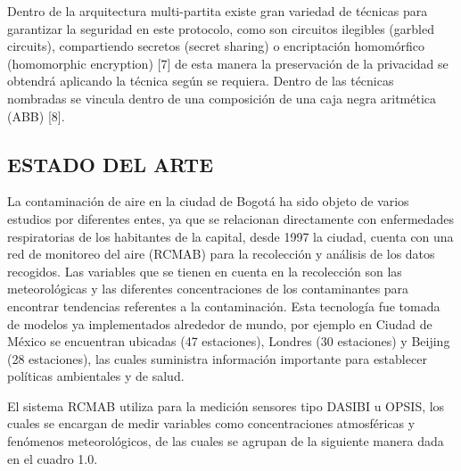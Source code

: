 \documentclass[a4paper, 11pt, oneside]{article}
\theoremstyle{definition}
\theoremstyle{remark}
\begin{document}
Dentro de la arquitectura multi-partita existe gran variedad de técnicas para garantizar la seguridad en este protocolo, como son circuitos ilegibles (garbled circuits), compartiendo secretos (secret sharing) o encriptación homomórfico (homomorphic encryption) [7] de esta manera la preservación de la privacidad se obtendrá aplicando la técnica según se requiera. Dentro de las técnicas nombradas se vincula dentro de una composición de una caja negra aritmética (ABB) [8].

\subsection{ESTADO DEL ARTE}
La contaminación de aire en la ciudad de Bogotá ha sido objeto de varios estudios por diferentes entes, ya que se relacionan directamente con enfermedades respiratorias de los habitantes de la capital, desde 1997 la ciudad, cuenta con una red de monitoreo del aire (RCMAB) para la recolección y análisis de los datos recogidos. Las variables que se tienen en cuenta en la recolección son las meteorológicas y las diferentes concentraciones de los contaminantes para encontrar tendencias referentes a la contaminación. Esta tecnología fue tomada de modelos ya implementados alrededor de mundo, por ejemplo en Ciudad de México se encuentran ubicadas (47 estaciones), Londres (30 estaciones) y Beijing (28 estaciones), las cuales suministra información importante para establecer políticas ambientales y de salud.

El sistema RCMAB utiliza para la medición sensores tipo DASIBI u OPSIS, los cuales se encargan de medir variables  como concentraciones atmosféricas y fenómenos meteorológicos, de las cuales se agrupan de la siguiente manera dada en el cuadro 1.0.
\end{document}
